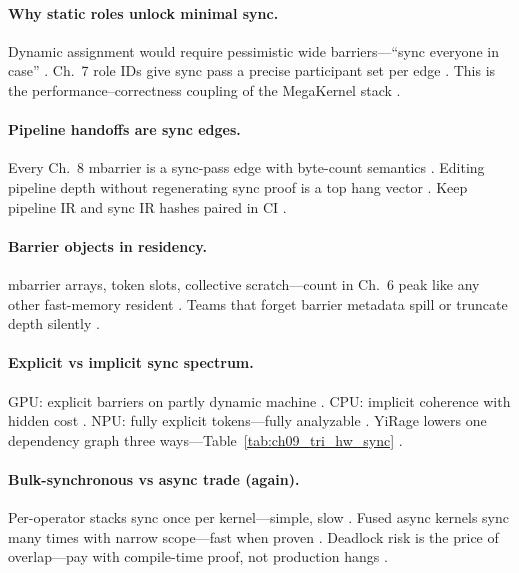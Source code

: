 \paragraph{Why static roles unlock minimal sync.}
Dynamic assignment would require pessimistic wide barriers---``sync everyone in case'' \citep{taxbreak2026,patel2025llminference,shah2024flashattention3}.
Ch.~7 role IDs give sync pass a precise participant set per edge \citep{yirage2026,mpk2025,nvidia2022hopper}.
This is the performance--correctness coupling of the MegaKernel stack \citep{dao2022flashattention,memoryfloor2026,semianalysis2024tma}.

\paragraph{Pipeline handoffs are sync edges.}
Every Ch.~8 mbarrier is a sync-pass edge with byte-count semantics \citep{semianalysis2024tma,shah2024flashattention3,dao2022flashattention}.
Editing pipeline depth without regenerating sync proof is a top hang vector \citep{yirage2026,taxbreak2026,wu2024mirage}.
Keep pipeline IR and sync IR hashes paired in CI \citep{chen2020compilerbasedhardw,mpk2025}.

\paragraph{Barrier objects in residency.}
mbarrier arrays, token slots, collective scratch---count in Ch.~6 peak like any other fast-memory resident \citep{memoryfloor2026,nvidia2022hopper,amd2024xdna}.
Teams that forget barrier metadata spill or truncate depth silently \citep{yirage2026,dao2022flashattention,chen2020compilerbasedhardw}.

\paragraph{Explicit vs implicit sync spectrum.}
GPU: explicit barriers on partly dynamic machine \citep{nvidia2022hopper,shah2024flashattention3}.
CPU: implicit coherence with hidden cost \citep{dlbook,patel2025llminference,memoryfloor2026}.
NPU: fully explicit tokens---fully analyzable \citep{amd2024xdna,amd2024aie,yirage2026}.
YiRage lowers one dependency graph three ways---Table~\ref{tab:ch09_tri_hw_sync} \citep{chen2020compilerbasedhardw,wu2024mirage,mpk2025}.

\paragraph{Bulk-synchronous vs async trade (again).}
Per-operator stacks sync once per kernel---simple, slow \citep{taxbreak2026,patel2025llminference}.
Fused async kernels sync many times with narrow scope---fast when proven \citep{shah2024flashattention3,semianalysis2024tma,dao2022flashattention}.
Deadlock risk is the price of overlap---pay with compile-time proof, not production hangs \citep{yirage2026,wu2024mirage,mpk2025}.


